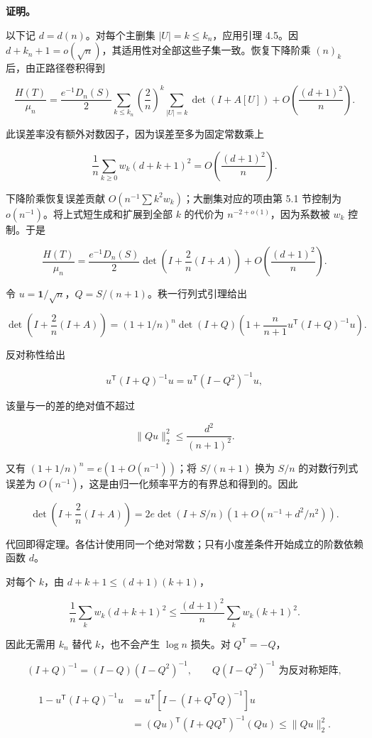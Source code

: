 \documentclass[11pt,a4paper]{article}
\begin{document}
\textbf{证明。}

以下记 \(d=d(n)\)。对每个主删集 \(|U|=k\le k_n\)，应用引理 4.5。因 \(d+k_n+1=o(\sqrt n)\)，其适用性对全部这些子集一致。恢复下降阶乘 \((n)_k\) 后，由正路径卷积得到

\[\frac{H(T)}{\mu_n}
=\frac{e^{-1}D_n(S)}2
\sum_{k\le k_n}\left(\frac2n\right)^k
\sum_{|U|=k}\det(I+A[U])
+O\left(\frac{(d+1)^2}{n}\right).\]

此误差率没有额外对数因子，因为误差至多为固定常数乘上

\[\frac1n\sum_{k\ge0}w_k(d+k+1)^2
=O\left(\frac{(d+1)^2}{n}\right).\]

下降阶乘恢复误差贡献 \(O(n^{-1}\sum k^2w_k)\)；大删集对应的项由第 5.1 节控制为 \(o(n^{-1})\)。将上式短生成和扩展到全部 \(k\) 的代价为 \(n^{-2+o(1)}\)，因为系数被 \(w_k\) 控制。于是

\[\frac{H(T)}{\mu_n}
=\frac{e^{-1}D_n(S)}2
\det\left(I+\frac2n(I+A)\right)
+O\left(\frac{(d+1)^2}{n}\right).\]

令 \(u=\mathbf1/\sqrt n\)，\(Q=S/(n+1)\)。秩一行列式引理给出

\[\det\left(I+\frac2n(I+A)\right)
=(1+1/n)^n\det(I+Q)
\left(1+\frac n{n+1}u^{\mathsf T}(I+Q)^{-1}u\right).\]

反对称性给出

\[u^{\mathsf T}(I+Q)^{-1}u=u^{\mathsf T}(I-Q^2)^{-1}u,\]

该量与一的差的绝对值不超过

\[\|Qu\|_2^2\le\frac{d^2}{(n+1)^2}.\]

又有 \((1+1/n)^n=e(1+O(n^{-1}))\)；将 \(S/(n+1)\) 换为 \(S/n\) 的对数行列式误差为 \(O(n^{-1})\)，这是由归一化频率平方的有界总和得到的。因此

\[\det\left(I+\frac2n(I+A)\right)
=2e\det(I+S/n)\left(1+O(n^{-1}+d^2/n^2)\right).\]

代回即得定理。各估计使用同一个绝对常数；只有小度差条件开始成立的阶数依赖函数 \(d\)。

对每个 \(k\)，由 \(d+k+1\le(d+1)(k+1)\)，

\[\frac1n\sum_kw_k(d+k+1)^2
\le\frac{(d+1)^2}{n}\sum_kw_k(k+1)^2.\]

因此无需用 \(k_n\) 替代 \(k\)，也不会产生 \(\log n\) 损失。对 \(Q^{\mathsf T}=-Q\)，

\[(I+Q)^{-1}=(I-Q)(I-Q^2)^{-1},\qquad
Q(I-Q^2)^{-1}\text{ 为反对称矩阵},\]

\[\begin{aligned}
1-u^{\mathsf T}(I+Q)^{-1}u
&=u^{\mathsf T}[I-(I+Q^{\mathsf T}Q)^{-1}]u\\
&=(Qu)^{\mathsf T}(I+QQ^{\mathsf T})^{-1}(Qu)
\le\|Qu\|_2^2.
\end{aligned}\]
\end{document}
